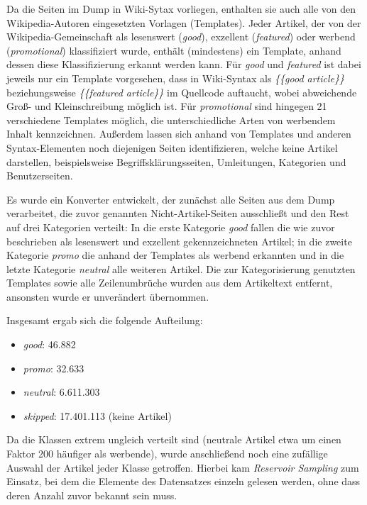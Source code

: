 Da die Seiten im Dump in Wiki-Sytax vorliegen, enthalten sie auch alle von den Wikipedia-Autoren eingesetzten Vorlagen (Templates). Jeder Artikel, der von der Wikipedia-Gemeinschaft als lesenswert (\emph{good}), exzellent (\emph{featured}) oder werbend (\emph{promotional}) klassifiziert wurde, enthält (mindestens) ein Template, anhand dessen diese Klassifizierung erkannt werden kann. Für \emph{good} und \emph{featured} ist dabei jeweils nur ein Template vorgesehen, dass in Wiki-Syntax als \textit{\{\{good article\}\}} beziehungsweise \textit{\{\{featured article\}\}} im Quellcode auftaucht, wobei abweichende Groß- und Kleinschreibung möglich ist. Für \emph{promotional} sind hingegen 21 verschiedene Templates möglich, die unterschiedliche Arten von werbendem Inhalt kennzeichnen. Außerdem lassen sich anhand von Templates und anderen Syntax-Elementen noch diejenigen Seiten identifizieren, welche keine Artikel darstellen, beispielsweise Begriffsklärungsseiten, Umleitungen, Kategorien und Benutzerseiten.

Es wurde ein Konverter entwickelt, der zunächst alle Seiten aus dem Dump verarbeitet, die zuvor genannten Nicht-Artikel-Seiten ausschließt und den Rest auf drei Kategorien verteilt: In die erste Kategorie \emph{good} fallen die wie zuvor beschrieben als lesenswert und exzellent gekennzeichneten Artikel; in die zweite Kategorie \emph{promo} die anhand der Templates als werbend erkannten und in die letzte Kategorie \emph{neutral} alle weiteren Artikel. Die zur Kategorisierung genutzten Templates sowie alle Zeilenumbrüche wurden aus dem Artikeltext entfernt, ansonsten wurde er unverändert übernommen.

Insgesamt ergab sich die folgende Aufteilung:
\begin{itemize}
    \item \emph{good}: 46.882
    \item \emph{promo}: 32.633
    \item \emph{neutral}: 6.611.303
    \item \emph{skipped}: 17.401.113 (keine Artikel)
\end{itemize}

Da die Klassen extrem ungleich verteilt sind (neutrale Artikel etwa um einen Faktor 200 häufiger als werbende), wurde anschließend noch eine zufällige Auswahl der Artikel jeder Klasse getroffen. Hierbei kam \textit{Reservoir Sampling} \cite{ReservoirSampling} zum Einsatz, bei dem die Elemente des Datensatzes einzeln gelesen werden, ohne dass deren Anzahl zuvor bekannt sein muss.

